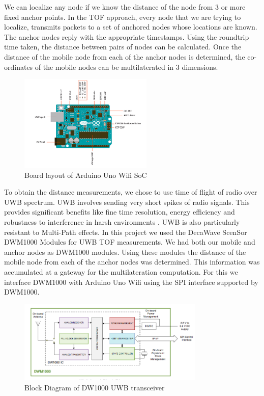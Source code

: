 \documentclass[journal,transmag]{IEEEtran}
\begin{document}
We can localize any node if we know the distance of the node from 3 or more fixed anchor points. In the TOF approach, every node that we are trying to localize, transmits packets to a set of anchored nodes whose locations are known. The anchor nodes reply with the appropriate timestamps. Using the roundtrip time taken, the distance between pairs of nodes can be calculated. Once the distance of the mobile node from each of the anchor nodes is determined, the co-ordinates of the mobile nodes can be multilaterated in 3 dimensions.
\begin{figure}[!h]
\centering
\includegraphics[width=2.5in]{arduinounobd}
\caption{{Board layout of Arduino Uno Wifi SoC}}
\label{arduinoBD}
\end{figure}
To obtain the distance measurements, we chose to use time of flight of radio over UWB spectrum. UWB involves sending very short spikes of radio signals. This provides significant benefits like fine time resolution, energy efficiency and robustness to interference in harsh environments \cite{uwb}. UWB is also particularly resistant to Multi-Path effects. In this project we used the DecaWave ScenSor DWM1000 Modules for UWB TOF measurements. We had both our mobile and anchor nodes as DWM1000 modules. Using these modules the distance of the mobile node from each of the anchor nodes was determined.  This information was accumulated at a gateway for the multilateration computation. For this we interface DWM1000 with Arduino Uno Wifi using the SPI interface supported by DWM1000.

\begin{figure}[!h]
\centering
\includegraphics[width=3.5in]{dw1000bd}
\caption{{Block Diagram of DW1000 UWB transceiver}}
\label{DW1000BD}
\end{figure}
\end{document}
